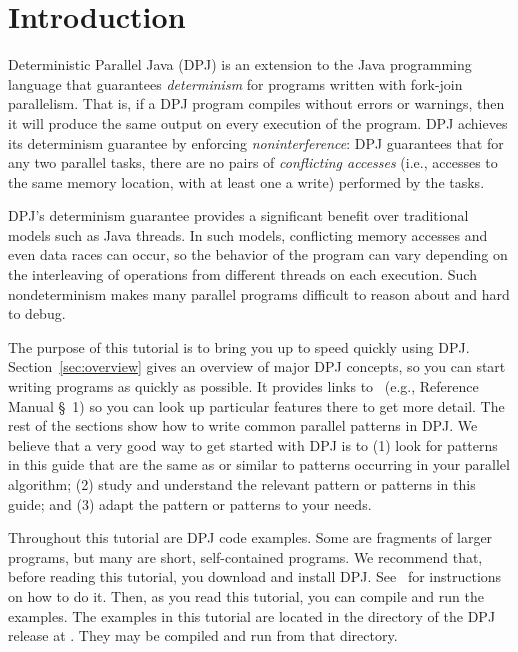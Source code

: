 \section{Introduction%
\label{sec:introduction}}

Deterministic Parallel Java (DPJ) is an extension to the Java
programming language that guarantees \emph{determinism} for programs
written with fork-join parallelism.  That is, if a DPJ program
compiles without errors or warnings, then it will produce the same
output on every execution of the program.  DPJ achieves its
determinism guarantee by enforcing \emph{noninterference}: DPJ
guarantees that for any two parallel tasks, there are no pairs of
\emph{conflicting accesses} (i.e., accesses to the same memory
location, with at least one a write) performed by the tasks.

DPJ's determinism guarantee provides a significant benefit over
traditional models such as Java threads.  In such models, conflicting
memory accesses and even data races can occur, so the behavior of the
program can vary depending on the interleaving of operations from
different threads on each execution.  Such nondeterminism makes many
parallel programs difficult to reason about and hard to debug.

The purpose of this tutorial is to bring you up to speed quickly using
DPJ.  Section~\ref{sec:overview} gives an overview of major DPJ
concepts, so you can start writing programs as quickly as possible.
It provides links to \ (e.g., Reference Manual \S~1) so you
can look up particular features there to get more detail.  The rest of
the sections show how to write common parallel patterns in DPJ.  We
believe that a very good way to get started with DPJ is to (1) look
for patterns in this guide that are the same as or similar to patterns
occurring in your parallel algorithm; (2) study and understand the
relevant pattern or patterns in this guide; and (3) adapt the pattern
or patterns to your needs.

Throughout this tutorial are DPJ code examples.  Some are fragments of
larger programs, but many are short, self-contained programs.  We
recommend that, before reading this tutorial, you download and install
DPJ.  See \installmanual\ for instructions on how to do it.  Then, as
you read this tutorial, you can compile and run the examples.  The
examples in this tutorial are located in the directory
 of the DPJ release
at .  They may be compiled and run from that
directory.

